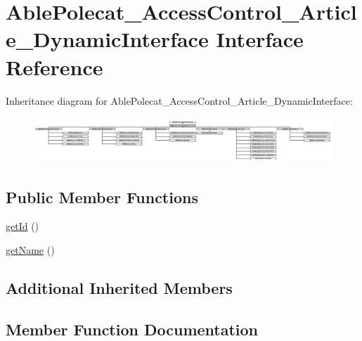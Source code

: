 \hypertarget{interface_able_polecat___access_control___article___dynamic_interface}{}\section{Able\+Polecat\+\_\+\+Access\+Control\+\_\+\+Article\+\_\+\+Dynamic\+Interface Interface Reference}
\label{interface_able_polecat___access_control___article___dynamic_interface}
Inheritance diagram for Able\+Polecat\+\_\+\+Access\+Control\+\_\+\+Article\+\_\+\+Dynamic\+Interface\+:\begin{figure}[H]
\begin{center}
\leavevmode
\includegraphics[height=1.707317cm]{interface_able_polecat___access_control___article___dynamic_interface}
\end{center}
\end{figure}
\subsection*{Public Member Functions}
\begin{DoxyCompactItemize}
\item 
\hyperlink{interface_able_polecat___access_control___article___dynamic_interface_a12251d0c022e9e21c137a105ff683f13}{get\+Id} ()
\item 
\hyperlink{interface_able_polecat___access_control___article___dynamic_interface_a3d0963e68bb313b163a73f2803c64600}{get\+Name} ()
\end{DoxyCompactItemize}
\subsection*{Additional Inherited Members}


\subsection{Member Function Documentation}
\hypertarget{interface_able_polecat___access_control___article___dynamic_interface_a12251d0c022e9e21c137a105ff683f13}{}
